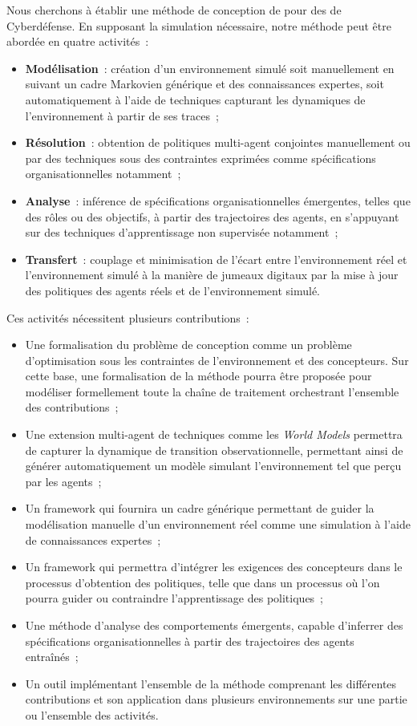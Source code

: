 \noindent
Nous cherchons à établir une méthode de conception de  pour des  de Cyberdéfense. En supposant la simulation nécessaire, notre méthode peut être abordée en quatre activités~:
\begin{itemize}
  \item \textbf{Modélisation}~: création d'un environnement simulé soit manuellement en suivant un cadre Markovien générique et des connaissances expertes, soit automatiquement à l'aide de techniques  capturant les dynamiques de l'environnement à partir de ses traces~;
  \item \textbf{Résolution}~: obtention de politiques multi-agent conjointes manuellement ou par des techniques  sous des contraintes exprimées comme spécifications organisationnelles notamment~;
  \item \textbf{Analyse}~: inférence de spécifications organisationnelles émergentes, telles que des rôles ou des objectifs, à partir des trajectoires des agents, en s'appuyant sur des techniques d'apprentissage non supervisée notamment~;
  \item \textbf{Transfert}~: couplage et minimisation de l'écart entre l'environnement réel et l'environnement simulé à la manière de jumeaux digitaux par la mise à jour des politiques des agents réels et de l'environnement simulé.
\end{itemize}



\noindent Ces activités nécessitent plusieurs contributions~:
\begin{itemize}
  \item Une formalisation du problème de conception comme un problème d'optimisation sous les contraintes de l'environnement et des concepteurs. Sur cette base, une formalisation de la méthode pourra être proposée pour modéliser formellement toute la chaîne de traitement orchestrant l'ensemble des contributions~;
  \item Une extension multi-agent de techniques  comme les \textit{World Models} permettra de capturer la dynamique de transition observationnelle, permettant ainsi de générer automatiquement un modèle simulant l'environnement tel que perçu par les agents~;
  \item Un framework qui fournira un cadre générique permettant de guider la modélisation manuelle d'un environnement réel comme une simulation à l'aide de connaissances expertes~;
  \item Un framework qui permettra d'intégrer les exigences des concepteurs dans le processus d'obtention des politiques, telle que dans un processus  où l'on pourra guider ou contraindre l'apprentissage des politiques~;
  \item Une méthode d'analyse des comportements émergents, capable d'inferrer des spécifications organisationnelles à partir des trajectoires des agents entraînés~;
  \item Un outil implémentant l'ensemble de la méthode comprenant les différentes contributions et son application dans plusieurs environnements sur une partie ou l'ensemble des activités.
\end{itemize}

